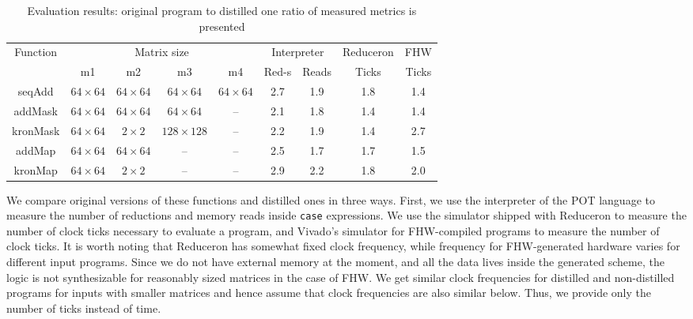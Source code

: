 \begin{table}
  \centering    
  \begin{tabular}{|c|c|c|c|c||c|c|c|c|}
      \hline
      \multirow{2}{*}{Function} &  \multicolumn{4}{c||}{Matrix size}  & \multicolumn{2}{c|}{Interpreter}            & Reduceron & FHW\\
      \cline{2-9}
                                &   m1 & m2 & m3 & m4                & Red-s & Reads                               & Ticks     & Ticks \\
      \hline
      seqAdd   & $64 \times 64$ & $64 \times 64$ & $64 \times 64$ & $64 \times 64$ & 2.7          & 1.9        & 1.8 & 1.4  \\ 
      addMask  & $64 \times 64$ & $64 \times 64$ & $64 \times 64$ & --             & 2.1          & 1.8        & 1.4 & 1.4  \\ 
      kronMask & $64 \times 64$ & $2 \times 2$   &$128 \times 128$& --             & 2.2          & 1.9        & 1.4 & 2.7  \\ 
      addMap   & $64 \times 64$ & $64 \times 64$ & --             & --             & 2.5          & 1.7        & 1.7 & 1.5  \\
      kronMap  & $64 \times 64$ & $2 \times 2$   & --             & --             & 2.9          & 2.2        & 1.8 & 2.0  \\ 
      \hline
      
  \end{tabular}
  \caption{Evaluation results: original program to distilled one ratio of measured metrics is presented}
  \label{tbl:evaluationResults}
\end{table}

We compare original versions of these functions and distilled ones in three ways.
First, we use the interpreter of the POT language to measure the number of reductions and memory reads inside \verb|case| expressions.
We use the simulator shipped with Reduceron to measure the number of clock ticks necessary to evaluate a program, and Vivado's simulator for FHW-compiled programs to measure the number of clock ticks.
It is worth noting that Reduceron has somewhat fixed clock frequency, while frequency for FHW-generated hardware varies for different input programs. 
Since we do not have external memory at the moment, and all the data lives inside the generated scheme, the logic is not synthesizable for reasonably sized matrices in the case of FHW.
We get similar clock frequencies for distilled and non-distilled programs for inputs with smaller matrices and hence assume that clock frequencies are also similar below. 
Thus, we provide only the number of ticks instead of time.

